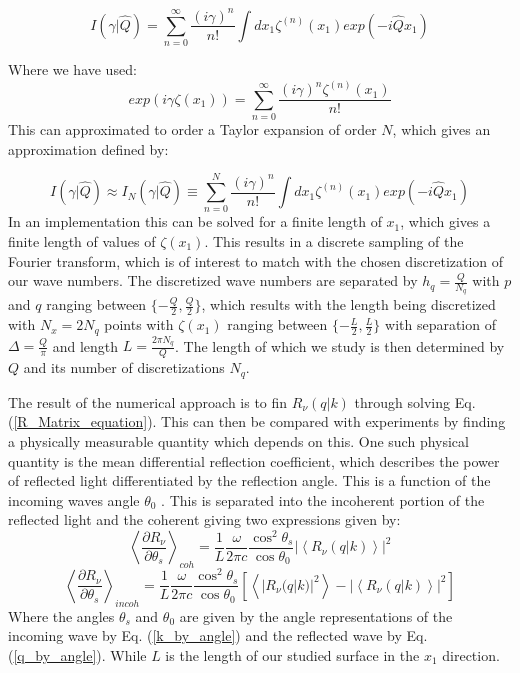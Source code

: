 \documentclass[../main.tex]{subfiles}
\begin{document}
\begin{equation}
    I(\gamma |\hat{Q}) = \sum^{\infty}_{n=0} \frac{(i\gamma)^n}{n!} \int dx_1 \zeta^{(n)}(x_1) exp(-i\hat{Q}x_1)
\end{equation}

Where we have used: 
\begin{equation}
    exp(i\gamma\zeta(x_1)) = \sum^{\infty}_{n=0}\frac{(i\gamma)^n \zeta^{(n)}(x_1)}{n!}
\end{equation}
This can approximated to order a Taylor expansion of order $N$, which gives an approximation defined by:

\begin{equation}
    I(\gamma|\hat{Q}) \approx I_N(\gamma|\hat{Q}) \equiv \sum^N_{n=0} \frac{(i\gamma)^n}{n!} \int dx_1 \zeta^{(n)}(x_1) exp(-i\hat{Q}x_1)
\end{equation}
In an implementation this can be solved for a finite length of $x_1$, which gives a finite length of values of $\zeta(x_1)$. This results in a discrete sampling of the Fourier transform, which is of interest to match with the chosen discretization of our wave numbers. The discretized wave numbers are separated by $h_q = \frac{Q}{N_q}$ with $p$ and $q$ ranging between $\{-\frac{Q}{2}, \frac{Q}{2} \}$, which results with the length being discretized with $N_x = 2 N_q $ points with $\zeta(x_1)$ ranging between $\{-\frac{L}{2}, \frac{L}{2} \}$ with separation of $\Delta = \frac{Q}{\pi}$ and length $L = \frac{2\pi N_q}{Q}$. The length of which we study is then determined by $Q$ and its number of discretizations $N_q$.

The result of the numerical approach is to fin $R_\nu(q|k)$ through solving Eq. (\ref{R_Matrix_equation}). This can then be compared with experiments by finding a physically measurable quantity which depends on this. One such physical quantity is the mean differential reflection coefficient, which describes the power of reflected light differentiated by the reflection angle. This is a function of the incoming waves angle $\theta_0$ \cite{Simonsen2010}. This is separated into the incoherent portion of the reflected light and the coherent giving two expressions given by:
\begin{equation}
    \left\langle \frac{\partial R_\nu}{\partial \theta_s}\right\rangle_{coh} = \frac{1}{L}\frac{\omega}{2\pi c}\frac{\cos^2 \theta_s}{\cos \theta_0} |\left\langle R_\nu(q|k) \right\rangle|^2
\label{DRC_coh}
\end{equation}
\begin{equation}
    \left\langle \frac{\partial R_\nu}{\partial \theta_s}\right\rangle_{incoh} = \frac{1}{L}\frac{\omega}{2\pi c}\frac{\cos^2 \theta_s}{\cos \theta_0} \left[ \left\langle |R_\nu (q|k) |^2 \right\rangle - |\left\langle R_\nu(q|k) \right\rangle|^2 \right]
\label{DRC_incoh}
\end{equation}
Where the angles $\theta_s$ and $\theta_0$ are given by the angle representations of the incoming wave by Eq. (\ref{k_by_angle}) and the reflected wave by Eq. (\ref{q_by_angle}). While $L$ is the length of our studied surface in the $x_1$ direction. 
\end{document}
